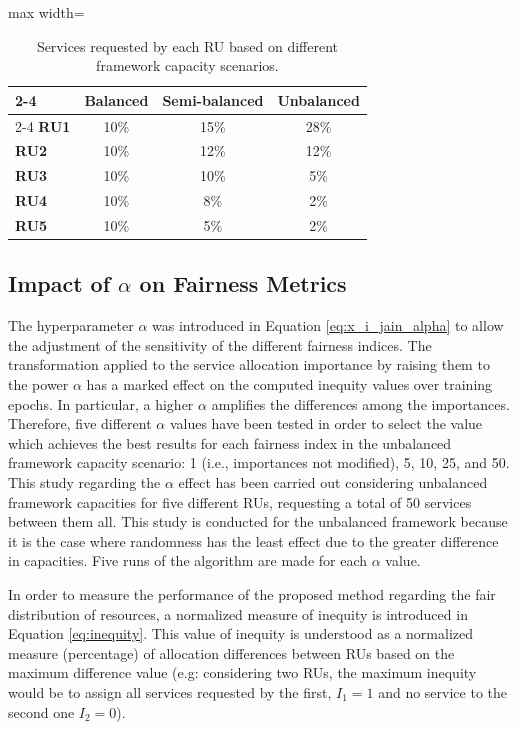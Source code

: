 \documentclass[preprint,12pt]{elsarticle}
\begin{document}
\begin{table}[htbp]
\centering
\begin{adjustbox}{max width=\textwidth}
\begin{tabular}{|l|c|c|c|}
\cline{2-4}
\multicolumn{1}{c|}{} & \textbf{Balanced} & \textbf{Semi-balanced} & \textbf{Unbalanced} \\
\cline{2-4} \hline
\textbf{RU1} & 10\% & 15\% & 28\% \\ \hline
\textbf{RU2} & 10\% & 12\% & 12\% \\ \hline
\textbf{RU3} & 10\% & 10\% & 5\% \\ \hline
\textbf{RU4} & 10\% & 8\% & 2\% \\ \hline
\textbf{RU5} & 10\% & 5\% & 2\% \\ \hline
\end{tabular}
\end{adjustbox}
\caption{Services requested by each RU based on different framework capacity scenarios.}
\label{tab:requests}
\end{table}

\subsection{Impact of $\alpha$ on Fairness Metrics}

The hyperparameter $\alpha$ was introduced in Equation \ref{eq:x_i_jain_alpha} to allow the adjustment of the sensitivity of the different fairness indices. The transformation applied to the service allocation importance by raising them to the power $\alpha$ has a marked effect on the computed inequity values over training epochs. In particular, a higher $\alpha$ amplifies the differences among the importances. Therefore, five different $\alpha$ values have been tested in order to select the value which achieves the best results for each fairness index in the unbalanced framework capacity scenario: 1 (i.e., importances not modified), 5, 10, 25, and 50. This study regarding the $\alpha$ effect has been carried out considering unbalanced framework capacities for five different RUs, requesting a total of 50 services between them all. This study is conducted for the unbalanced framework because it is the case where randomness has the least effect due to the greater difference in capacities. Five runs of the algorithm are made for each $\alpha$ value.

In order to measure the performance of the proposed method regarding the fair distribution of resources, a normalized measure of inequity is introduced in Equation \ref{eq:inequity}. This value of inequity is understood as a normalized measure (percentage) of allocation differences between RUs based on the maximum difference value (e.g: considering two RUs, the maximum inequity would be to assign all services requested by the first,  $ I_1 = 1 $ and no service to the second one $ I_2 = 0 $).
\end{document}
